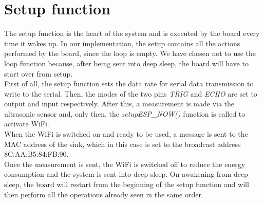 \section{Setup function}
The setup function is the heart of the system and is executed by the board every time it wakes up. In our implementation, the setup contains all the actions performed by the board, since the loop is empty. We have chosen not to use the loop function because, after being sent into deep sleep, the board will have to start over from setup.\\
First of all, the setup function sets the data rate for serial data transmission to write to the serial.
Then, the modes of the two pins \textit{TRIG} and \textit{ECHO} are set to output and input respectively.
After this, a measurement is made via the ultrasonic sensor and, only then, the \textit{setupESP\_NOW()} function is called to activate WiFi.\\
When the WiFi is switched on and ready to be used, a message is sent to the MAC address of the sink, which in this case is set to the broadcast address 8C:AA:B5:84:FB:90.\\
Once the measurement is sent, the WiFi is switched off to reduce the energy consumption and the system is sent into deep sleep.
On awakening from deep sleep, the board will restart from the beginning of the setup function and will then perform all the operations already seen in the same order.\\






